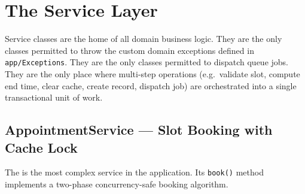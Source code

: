 \section{The Service Layer}
\label{sec:service-layer}

Service classes are the home of all domain business logic. They are the
only classes permitted to throw the custom domain exceptions defined in
\texttt{app/Exceptions}. They are the only classes permitted to dispatch
queue jobs. They are the only place where multi-step operations
(e.g.\ validate slot, compute end time, clear cache, create record,
dispatch job) are orchestrated into a single transactional unit of work.

\subsection{AppointmentService --- Slot Booking with Cache Lock}

The  is the most complex service in the
application. Its \texttt{book()} method implements a two-phase
concurrency-safe booking algorithm.

